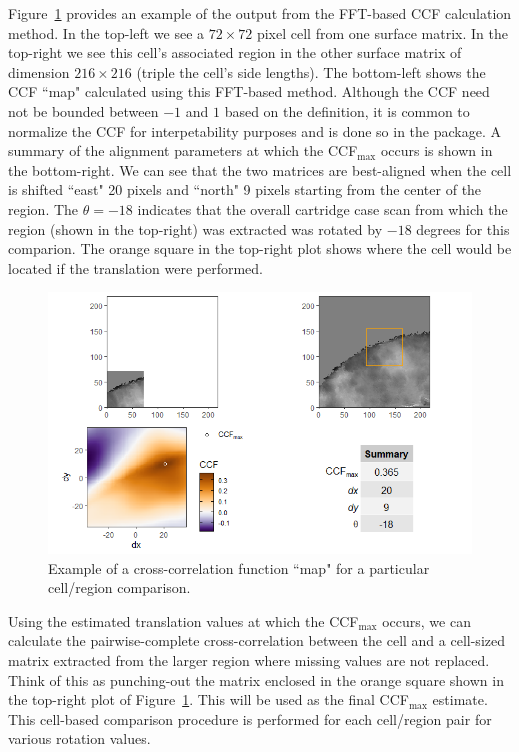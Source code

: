 Figure~\ref{figure:ccfMap_example} provides an example of the output from the FFT-based CCF calculation method. In the top-left we see a $72 \times 72$ pixel cell from one surface matrix. In the top-right we see this cell's associated region in the other surface matrix of dimension $216 \times 216$ (triple the cell's side lengths). The bottom-left shows the CCF ``map" calculated using this FFT-based method. Although the CCF need not be bounded between $-1$ and $1$ based on the definition, it is common to normalize the CCF for interpetability purposes and is done so in the  package. A summary of the alignment parameters at which the CCF$_{\max}$ occurs is shown in the bottom-right. We can see that the two matrices are best-aligned when the cell is shifted ``east" 20 pixels and ``north" 9 pixels starting from the center of the region. The $\theta = -18$ indicates that the overall cartridge case scan from which the region (shown in the top-right) was extracted was rotated by $-18$ degrees for this comparion. The orange square in the top-right plot shows where the cell would be located if the translation were performed.
\begin{figure}[htbp]
  \centering
	\includegraphics[width = \linewidth]{./images/ccfMap_example.png}
	\caption{Example of a cross-correlation function ``map" for a particular cell/region comparison.}
 	\label{figure:ccfMap_example}
\end{figure}

Using the estimated translation values at which the CCF$_{\max}$ occurs, we can calculate the pairwise-complete cross-correlation between the cell and a cell-sized matrix extracted from the larger region where missing values are not replaced. Think of this as punching-out the matrix enclosed in the orange square shown in the top-right plot of Figure~\ref{figure:ccfMap_example}. This will be used as the final CCF$_{\max}$ estimate. This cell-based comparison procedure is performed for each cell/region pair for various rotation values.

